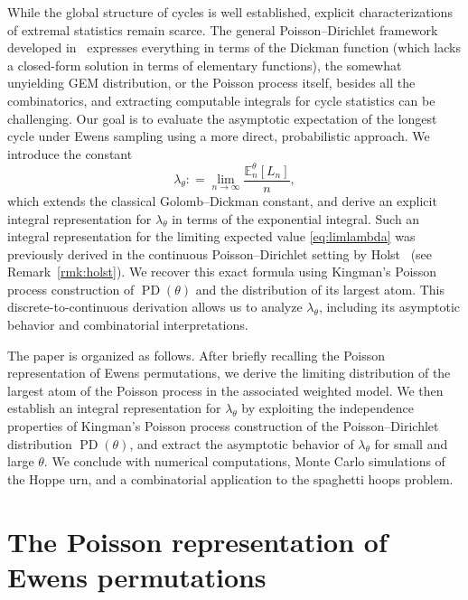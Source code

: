 \documentclass{amsart}
\theoremstyle{definition}
\theoremstyle{remark}
\numberwithin{equation}{section}
\newcommand{\deq}{\mathrel{\mathop:}=}
\DeclareMathOperator{\PD}{PD}
\begin{document}
While the global structure of cycles is well established, explicit characterizations of extremal statistics remain scarce. The general Poisson--Dirichlet framework developed in~\cite{ABT2003,Arratia1992,Pitman2006} expresses everything in terms of the Dickman function (which lacks a closed-form solution in terms of elementary functions), the somewhat unyielding GEM distribution, or the Poisson process itself, besides all the combinatorics, and extracting computable integrals for cycle statistics can be challenging. Our goal is to evaluate the asymptotic expectation of the longest cycle under Ewens sampling using a more direct, probabilistic approach. We introduce the constant 
\begin{equation}
\label{eq:limlambda}
\lambda_{\theta} \deq \lim_{n \to \infty} \frac{\mathbb{E}_{n}^{\theta}[L_{n}]}{n},
\end{equation}
which extends the classical Golomb--Dickman constant, and derive an explicit integral representation for $\lambda_{\theta}$ in terms of the exponential integral. Such an integral representation for the limiting expected value \eqref{eq:limlambda} was previously derived in the continuous Poisson--Dirichlet setting by Holst~\cite{Holst2001} (see Remark~\ref{rmk:holst}). We recover this exact formula using Kingman's Poisson process construction of $\PD(\theta)$ and the distribution of its largest atom. This discrete-to-continuous derivation allows us to analyze $\lambda_{\theta}$, including its asymptotic behavior and combinatorial interpretations.

The paper is organized as follows. After briefly recalling the Poisson representation of Ewens permutations, we derive the limiting distribution of the largest atom of the Poisson process in the associated weighted model. We then establish an integral representation for $\lambda_{\theta}$ by exploiting the independence properties of Kingman's Poisson process construction of the Poisson--Dirichlet distribution $\PD(\theta)$, and extract the asymptotic behavior of $\lambda_{\theta}$ for small and large $\theta$. We conclude with numerical computations, Monte Carlo simulations of the Hoppe urn, and a combinatorial application to the spaghetti hoops problem.


\section{The Poisson representation of Ewens permutations}
\label{sec:poisson}
\end{document}
